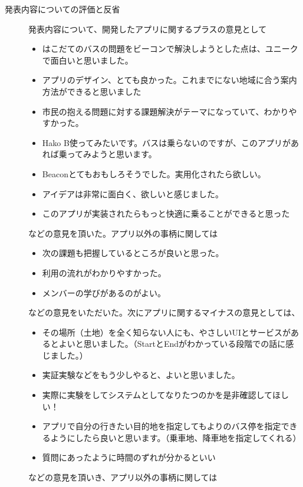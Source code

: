 \documentclass[openany,11pt,papersize]{jsbook}
\begin{document}
\begin{description}

\item[発表内容についての評価と反省]\mbox\\
発表内容について、開発したアプリに関するプラスの意見として
\begin{itemize}

\item はこだてのバスの問題をビーコンで解決しようとした点は、ユニークで面白いと思いました。
\item アプリのデザイン、とても良かった。これまでにない地域に合う案内方法ができると思いました
\item 市民の抱える問題に対する課題解決がテーマになっていて、わかりやすかった。
\item Hako B使ってみたいです。バスは乗らないのですが、このアプリがあれば乗ってみようと思います。
\item Beaconとてもおもしろそうでした。実用化されたら欲しい。
\item アイデアは非常に面白く、欲しいと感じました。
\item このアプリが実装されたらもっと快適に乗ることができると思った

\end{itemize}
などの意見を頂いた。アプリ以外の事柄に関しては
\begin{itemize}

\item 次の課題も把握しているところが良いと思った。
\item 利用の流れがわかりやすかった。
\item メンバーの学びがあるのがよい。

\end{itemize}
などの意見をいただいた。次にアプリに関するマイナスの意見としては、
\begin{itemize}

\item その場所（土地）を全く知らない人にも、やさしいUIとサービスがあるとよいと思いました。（StartとEndがわかっている段階での話に感じました。）
\item 実証実験などをもう少しやると、よいと思いました。
\item 実際に実験をしてシステムとしてなりたつのかを是非確認してほしい！
\item アプリで自分の行きたい目的地を指定してもよりのバス停を指定できるようにしたら良いと思います。（乗車地、降車地を指定してくれる）
\item 質問にあったように時間のずれが分かるといい

\end{itemize}
などの意見を頂いき、アプリ以外の事柄に関しては
\begin{itemize}


\end{itemize}
\end{description}
\end{document}
